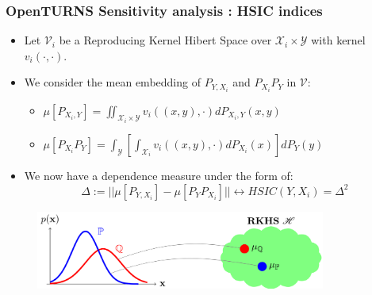 \documentclass{beamer}
\begin{document}
  \begin{frame}
  \frametitle{OpenTURNS Sensitivity analysis : HSIC indices}
  
  \small
  
    \begin{itemize}
    \item Let $\mathcal{V}_i$ be a Reproducing Kernel Hibert Space over $\mathcal{X}_i \times \mathcal{Y} $ with kernel $v_i(\cdot, \cdot)$.
    \item We consider the mean embedding of $P_{Y,X_i}$ and $P_{X_i} P_Y$ in $\mathcal{V}$:
    \begin{itemize}
        \item $\mu [ P_{X_i, Y} ] = \iint_{\mathcal{X}_i \times \mathcal{Y}} v_i((x,y), \cdot) dP_{X_i, Y}(x,y)$
        \item $\mu [ P_{X_i} P_Y ] = \int_{\mathcal{Y}} \left[ \int_{\mathcal{X}_i} v_i((x,y), \cdot) dP_{X_i}(x) \right] dP_Y(y)$
    \end{itemize}
    \item We now have a dependence measure under the form of:
    \begin{equation*}
        \Delta := || \mu [ P_{Y,X_i} ] - \mu [ P_YP_{X_i} ]  || \longleftrightarrow HSIC(Y,X_i) = \Delta^2
    \end{equation*}
    \end{itemize}
  
  \begin{figure}
      \includegraphics[width=0.85\textwidth]{figures/RKHSEmbedding.png}
  \end{figure}
  
  \end{frame}
  
  
  
\end{document}
